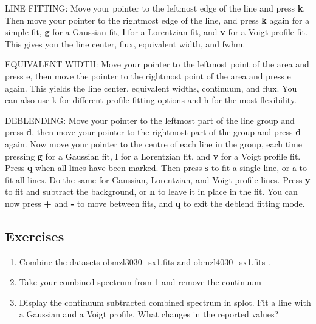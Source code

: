 LINE FITTING: Move your pointer to the leftmost edge of the line and press {\bf k}. Then move your pointer to the rightmost edge of the line, and press {\bf k} again for a simple fit, {\bf g} for a Gaussian fit, {\bf l} for a Lorentzian fit, and {\bf v} for a Voigt profile fit. This gives you the line center, flux, equivalent width, and fwhm.

EQUIVALENT WIDTH: Move your pointer to the leftmost point of the area and press e, then move the pointer to the rightmost point of the area and press e again. This yields the line center, equivalent widths, continuum, and flux. You can also use k for different profile fitting options and h for the most flexibility.

DEBLENDING: Move your pointer to the leftmost part of the line group and press {\bf d}, then move your pointer to the rightmost part of the group and press {\bf d} again. Now move your pointer to the centre of each line in the group, each time pressing {\bf g} for a Gaussian fit, {\bf l} for a Lorentzian fit, and {\bf v} for a Voigt profile fit. Press {\bf q} when all lines have been marked. Then press {\bf s} to fit a single line, or a to fit all lines. Do the same for Gaussian, Lorentzian, and Voigt profile lines. Press {\bf y} to fit and subtract the background, or {\bf n} to leave it in place in the fit. You can now press {\bf +} and {\bf -} to move between fits, and {\bf q} to exit the deblend fitting mode.


\subsection{Exercises}
\begin{enumerate}

\item Combine the datasets obmzl3030\_sx1.fits and obmzl4030\_sx1.fits .
\item Take your combined spectrum from 1 and remove the continuum
\item Display the continuum subtracted combined spectrum in splot. Fit a line with a Gaussian and a Voigt profile. What changes in the reported values?
\end{enumerate}
